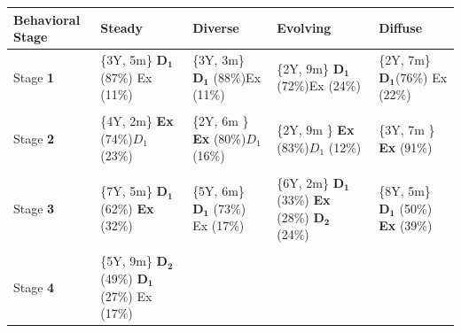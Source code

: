 \begin{table}[!h]
	\centering
	\begin{tabular}{p{40mm} p{25mm} p{25mm} p{25mm} p{25mm}@{}}
		\toprule
		{Behavioral Stage}  & {Steady} & {Diverse} & {Evolving} & {Diffuse} \\
		\midrule
		Stage \textbf{1}& \{3Y, 5m\} \newline $\mathbf{D_1}$ (87\%) \newline Ex (11\%) &
		\{3Y, 3m\} \newline $\mathbf{D_1}$ (88\%)\newline Ex (11\%)&
		\{2Y, 9m\} \newline $\mathbf{D_1}$ (72\%)\newline Ex (24\%) &
		\{2Y, 7m\} \newline $\mathbf{D_1}$(76\%) \newline Ex (22\%) \\\\
		Stage \textbf{2} &  \{4Y, 2m\} \newline \textbf{Ex} (74\%)\newline ${D_1}$ (23\%) &
		\{2Y, 6m \} \newline \textbf{Ex} (80\%)\newline ${D_1}$ (16\%) &
		\{2Y, 9m \} \newline \textbf{Ex} (83\%)\newline ${D_1}$ (12\%) &
		\{3Y, 7m \} \newline \textbf{Ex} (91\%) \\\\
		Stage \textbf{3} & \{7Y, 5m\} \newline $\mathbf{D_1}$ (62\%) \newline \textbf{Ex} (32\%)  &
		\{5Y, 6m\} \newline $\mathbf{D_1}$ (73\%) \newline Ex (17\%) &
		\{6Y, 2m\} \newline $\mathbf{D_1}$ (33\%) \newline \textbf{Ex} (28\%) \newline $\mathbf{D_2}$ (24\%)&
		\{8Y, 5m\} \newline $\mathbf{D_1}$ (50\%) \newline \textbf{Ex} (39\%) \\\\
		Stage \textbf{4} & \{5Y, 9m\} \newline $\mathbf{D_2}$ (49\%) \newline $\mathbf{D_1}$ (27\%) \newline Ex (17\%) &

\end{tabular}
\end{table}
